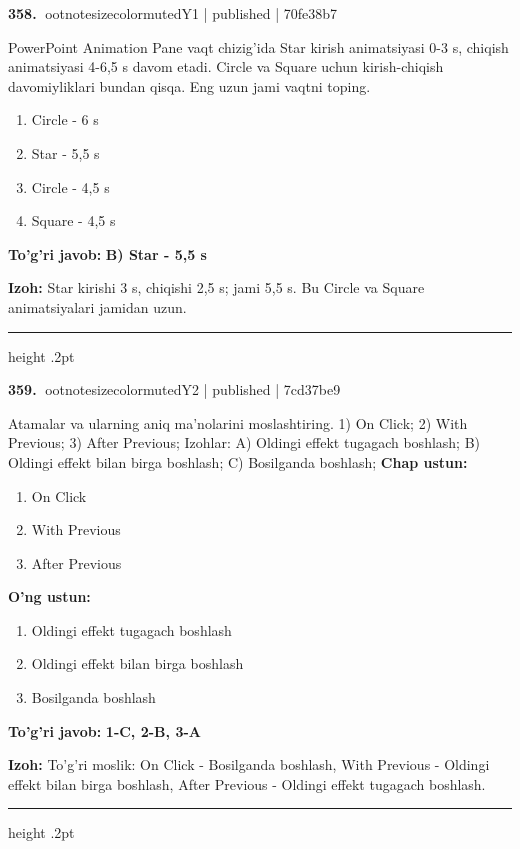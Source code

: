 \documentclass[10pt,a4paper]{article}
\begin{document}
\textbf{\color{ink}358.} {ootnotesizecolor{muted}Y1 | published | 70fe38b7}
\par
PowerPoint Animation Pane vaqt chizig'ida Star kirish animatsiyasi 0-3 s, chiqish animatsiyasi 4-6,5 s davom etadi. Circle va Square uchun kirish-chiqish davomiyliklari bundan qisqa. Eng uzun jami vaqtni toping.
\begin{enumerate}[label=\Alph*),leftmargin=9mm]
\item Circle - 6 s
\item Star - 5,5 s
\item Circle - 4,5 s
\item Square - 4,5 s
\end{enumerate}
\begin{tcolorbox}[enhanced,breakable,colback=teal!4,colframe=teal!55!black,boxrule=0.45pt,arc=1.2mm,left=2.8mm,right=2.8mm,top=2mm,bottom=2mm]
\textbf{\color{teal}To'g'ri javob:} \textbf{B) Star - 5,5 s}
\par\smallskip
\textbf{Izoh:} Star kirishi 3 s, chiqishi 2,5 s; jami 5,5 s. Bu Circle va Square animatsiyalari jamidan uzun.
\end{tcolorbox}
\vspace{2mm}\hrule height .2pt\vspace{2mm}

\textbf{\color{ink}359.} {ootnotesizecolor{muted}Y2 | published | 7cd37be9}
\par
Atamalar va ularning aniq ma'nolarini moslashtiring.  1) On Click;  2) With Previous;  3) After Previous;  Izohlar: A) Oldingi effekt tugagach boshlash;  B) Oldingi effekt bilan birga boshlash;  C) Bosilganda boshlash;
\textbf{Chap ustun:}\begin{enumerate}[label=\arabic*),leftmargin=9mm]
\item On Click
\item With Previous
\item After Previous
\end{enumerate}
\textbf{O'ng ustun:}\begin{enumerate}[label=\Alph*),leftmargin=9mm]
\item Oldingi effekt tugagach boshlash
\item Oldingi effekt bilan birga boshlash
\item Bosilganda boshlash
\end{enumerate}
\begin{tcolorbox}[enhanced,breakable,colback=teal!4,colframe=teal!55!black,boxrule=0.45pt,arc=1.2mm,left=2.8mm,right=2.8mm,top=2mm,bottom=2mm]
\textbf{\color{teal}To'g'ri javob:} \textbf{1-C, 2-B, 3-A}
\par\smallskip
\textbf{Izoh:} To'g'ri moslik: On Click - Bosilganda boshlash, With Previous - Oldingi effekt bilan birga boshlash, After Previous - Oldingi effekt tugagach boshlash.
\end{tcolorbox}
\vspace{2mm}\hrule height .2pt\vspace{2mm}
\end{document}
